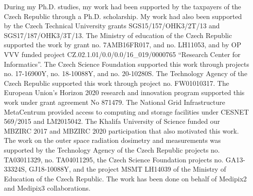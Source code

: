 During my Ph.D. studies, my work had been supported by the taxpayers of the Czech Republic through a Ph.D. scholarship.
My work had also been supported by the Czech Technical University grants SGS15/157/OHK3/2T/13 and SGS17/187/OHK3/3T/13.
The Ministry of education of the Czech Republic supported the work by grant no. 7AMB16FR017, and no. LH11053, and by OP VVV funded project CZ.02.1.01/0.0/0.0/16\_019/0000765 ``Research Center for Informatics''.
The Czech Science Foundation supported this work through projects no. 17-16900Y, no. 18-10088Y, and no. 20-10280S.
The Technology Agency of the Czech Republic supported this work through project no. FW01010317.
The European Union's Horizon 2020 research and innovation program supported this work under grant agreement No 871479.
The National Grid Infrastructure MetaCentrum provided access to computing and storage facilities under CESNET 569/2015 and LM2015042.
The Khalifa University of Science funded our MBZIRC 2017 and MBZIRC 2020 participation that also motivated this work.
The work on the outer space radiation dosimetry and measurements was supported by the Technology Agency of the Czech Republic projects no. TA03011329, no. TA04011295, the Czech Science Foundation projects no. GA13-33324S, GJ18-10088Y, and the project MSMT LH14039 of the Ministry of Education of the Czech Republic.
The work has been done on behalf of Medipix2 and Medipix3 collaborations.

\vspace{2.5cm}
